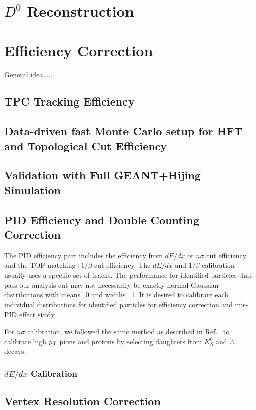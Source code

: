 \documentclass[a4paper]{article}
\begin{document}
\section{$D^0$ Reconstruction}

\section{Efficiency Correction}
General idea.....

\subsection{TPC Tracking Efficiency}

\subsection{Data-driven fast Monte Carlo setup for HFT and Topological Cut Efficiency}

\subsection{Validation with Full GEANT+Hijing Simulation}

\subsection{PID Efficiency and Double Counting Correction}

The PID efficiency part includes the efficiency from $dE/dx$ or $n\sigma$ cut efficiency and the TOF matching+$1/\beta$ cut efficiency. The $dE/dx$ and $1/\beta$ calibration usually uses a specific set of tracks. The performance for identified particles that pass our analysis cut may not necessarily be exactly normal Gaussian distributions with means=0 and widths=1. It is desired to calibrate each individual distributions for identified particles for efficiency correction and mis-PID effect study.

For $n\sigma$ calibration, we followed the same method as described in Ref.~\cite{Xu:2008th} to calibrate high $p_{\rm T}$ pions and protons by selecting daughters from $K_{S}^0$ and $\Lambda$ decays.

\subsubsection{$dE/dx$ Calibration}



\subsection{Vertex Resolution Correction}
\end{document}
